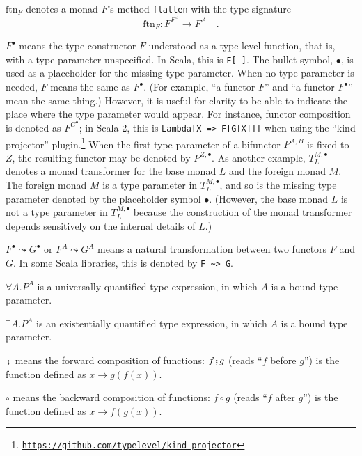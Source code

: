$\text{ftn}_{F}$ denotes a monad $F$'s method \lstinline!flatten!
with the type signature
\[
\text{ftn}_{F}:F^{F^{A}}\rightarrow F^{A}\quad.
\]

$F^{\bullet}$ means the type constructor $F$ understood as a type-level
function, \textemdash{} that is, with a type parameter unspecified.
In Scala, this is \lstinline!F[_]!. The bullet symbol, $\bullet$,
is used as a placeholder for the missing type parameter. When no type
parameter is needed, $F$ means the same as $F^{\bullet}$. (For example,
\textsf{``}a functor $F$\textsf{''} and \textsf{``}a functor $F^{\bullet}$\textsf{''} mean the same
thing.) However, it is useful for clarity to be able to indicate the
place where the type parameter would appear. For instance, functor
composition is denoted as $F^{G^{\bullet}}$; in Scala 2, this is
\texttt{}\lstinline!Lambda[X => F[G[X]]]! when using the \textsf{``}kind
projector\textsf{''} plugin.\footnote{\texttt{\href{https://github.com/typelevel/kind-projector}{https://github.com/typelevel/kind-projector}}}
When the first type parameter of a bifunctor $P^{A,B}$ is fixed to
$Z$, the resulting functor may be denoted by $P^{Z,\bullet}$. As
another example, $T_{L}^{M,\bullet}$ denotes a monad transformer
for the base monad $L$ and the foreign monad $M$. The foreign monad
$M$ is a type parameter in $T_{L}^{M,\bullet}$, and so is the missing
type parameter denoted by the placeholder symbol $\bullet$. (However,
the base monad $L$ is not a type parameter in $T_{L}^{M,\bullet}$
because the construction of the monad transformer depends sensitively
on the internal details of $L$.)

$F^{\bullet}\leadsto G^{\bullet}$ or $F^{A}\leadsto G^{A}$ means
a natural transformation between two functors $F$ and $G$. In some
Scala libraries, this is denoted by \lstinline!F ~> G!.

$\forall A.P^{A}$ is a universally quantified type expression, in
which $A$ is a bound type parameter.

$\exists A.P^{A}$ is an existentially quantified type expression,
in which $A$ is a bound type parameter.

$\bef$ means the forward composition
of functions: $f\bef g$ (reads \textsf{``}$f$ before $g$\textsf{''}) is the function
defined as $x\rightarrow g(f(x))$.

$\circ$ means the backward composition
of functions: $f\circ g$ (reads \textsf{``}$f$ after $g$\textsf{''}) is the function
defined as $x\rightarrow f(g(x))$.

